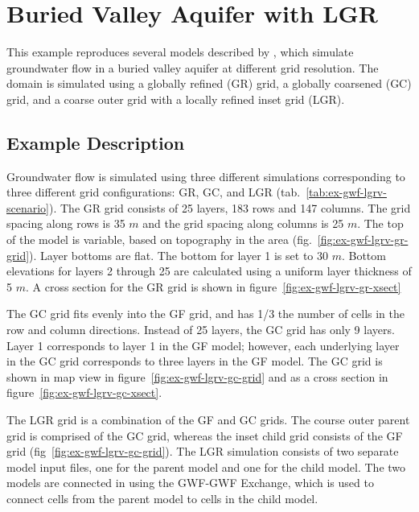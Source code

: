 \section{Buried Valley Aquifer with LGR}

This example reproduces several models described by \cite{vilhelmsen2012}, which simulate groundwater flow in a buried valley aquifer at different grid resolution.  The domain is simulated using a globally refined (GR) grid, a globally coarsened (GC) grid, and a coarse outer grid with a locally refined inset grid (LGR).  

\subsection{Example Description}

Groundwater flow is simulated using three different simulations corresponding to three different grid configurations: GR, GC, and LGR (tab.~\ref{tab:ex-gwf-lgrv-scenario}).  The GR grid consists of 25 layers, 183 rows and 147 columns.  The grid spacing along rows is 35 $m$ and the grid spacing along columns is 25 $m$.  The top of the model is variable, based on topography in the area (fig.~\ref{fig:ex-gwf-lgrv-gr-grid}).  Layer bottoms are flat.  The bottom for layer 1 is set to 30 $m$.  Bottom elevations for layers 2 through 25 are calculated using a uniform layer thickness of 5 $m$.  A cross section for the GR grid is shown in figure~\ref{fig:ex-gwf-lgrv-gr-xsect}

The GC grid fits evenly into the GF grid, and has 1/3 the number of cells in the row and column directions.  Instead of 25 layers, the GC grid has only 9 layers.  Layer 1 corresponds to layer 1 in the GF model; however, each underlying layer in the GC grid corresponds to three layers in the GF model.  The GC grid is shown in map view in figure~\ref{fig:ex-gwf-lgrv-gc-grid} and as a cross section in figure~\ref{fig:ex-gwf-lgrv-gc-xsect}.

The LGR grid is a combination of the GF and GC grids.  The course outer parent grid is comprised of the GC grid, whereas the inset child grid consists of the GF grid (fig~\ref{fig:ex-gwf-lgrv-gc-grid}).  The LGR simulation consists of two separate model input files, one for the parent model and one for the child model.  The two models are connected in \mf using the GWF-GWF Exchange, which is used to connect cells from the parent model to cells in the child model.

